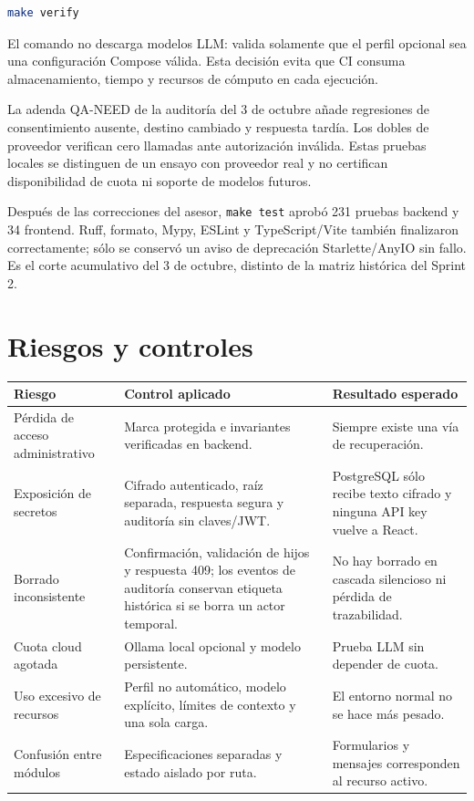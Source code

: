 \documentclass[11pt,letterpaper]{article}
\newcommand{\file}[1]{\texttt{#1}}
\begin{document}
\begin{lstlisting}[style=terminal,language=bash]
make verify
\end{lstlisting}

El comando no descarga modelos LLM: valida solamente que el perfil opcional sea una configuración Compose válida. Esta decisión evita que CI consuma almacenamiento, tiempo y recursos de cómputo en cada ejecución.

La adenda QA-NEED de la auditoría del 3 de octubre añade regresiones de consentimiento
ausente, destino cambiado y respuesta tardía. Los dobles de proveedor verifican cero
llamadas ante autorización inválida. Estas pruebas locales se distinguen de un ensayo
con proveedor real y no certifican disponibilidad de cuota ni soporte de modelos futuros.

Después de las correcciones del asesor, \file{make test} aprobó 231 pruebas backend
y 34 frontend. Ruff, formato, Mypy, ESLint y TypeScript/Vite también finalizaron
correctamente; sólo se conservó un aviso de deprecación Starlette/AnyIO sin fallo.
Es el corte acumulativo del 3 de octubre, distinto de la matriz histórica del Sprint 2.

\section{Riesgos y controles}

\begin{tabularx}{\textwidth}{@{}p{}p{}X@{}}
  \toprule
  Riesgo & Control aplicado & Resultado esperado \\
  \midrule
  Pérdida de acceso administrativo & Marca protegida e invariantes verificadas en backend. & Siempre existe una vía de recuperación. \\
  Exposición de secretos & Cifrado autenticado, raíz separada, respuesta segura y auditoría sin claves/JWT. & PostgreSQL sólo recibe texto cifrado y ninguna API key vuelve a React. \\
  Borrado inconsistente & Confirmación, validación de hijos y respuesta 409; los eventos de auditoría conservan etiqueta histórica si se borra un actor temporal. & No hay borrado en cascada silencioso ni pérdida de trazabilidad. \\
  Cuota cloud agotada & Ollama local opcional y modelo persistente. & Prueba LLM sin depender de cuota. \\
  Uso excesivo de recursos & Perfil no automático, modelo explícito, límites de contexto y una sola carga. & El entorno normal no se hace más pesado. \\
  Confusión entre módulos & Especificaciones separadas y estado aislado por ruta. & Formularios y mensajes corresponden al recurso activo. \\
  \bottomrule
\end{tabularx}
\end{document}

